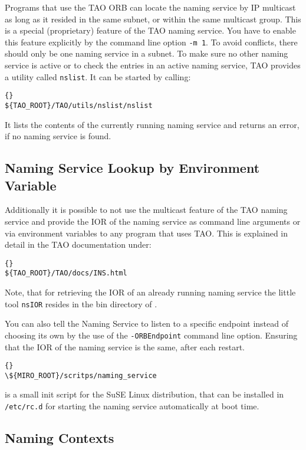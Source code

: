 Programs that use the TAO ORB can locate the naming service by IP
multicast as long as it resided in the same subnet, or within the same
multicast group. This is a special (proprietary) feature of the TAO
naming service. You have to enable this
feature explicitly by the command line option {\tt -m 1}. To avoid
conflicts, there should only be one naming service in a subnet. To
make sure no other naming service is active or to check the entries in
an active naming service, TAO provides a utility called {\tt nslist}.
It can be started by calling:

\begin{lstlisting}[frame=tb]{}
${TAO_ROOT}/TAO/utils/nslist/nslist 
\end{lstlisting}

It lists the contents of the currently running naming service and
returns an error, if no naming service is found.

\subsection{Naming Service Lookup by Environment Variable}

Additionally it is possible to not use the multicast feature of the
TAO naming service and provide the IOR of the naming service
as command line arguments or via environment variables to any program
that uses TAO. This is explained in detail in the TAO documentation
under:

\begin{lstlisting}[frame=tb]{}
${TAO_ROOT}/TAO/docs/INS.html
\end{lstlisting}

Note, that for retrieving the IOR of an already running naming service the
little tool {\tt nsIOR} resides in the bin directory of \miro.

You can also tell the Naming Service to listen to a specific endpoint
instead of choosing its own by the use of the {\tt -ORBEndpoint}
command line option. Ensuring that the IOR of the naming service is
the same, after each restart. 

\begin{lstlisting}[frame=tb]{}
\${MIRO_ROOT}/scritps/naming_service
\end{lstlisting}

is a small init script for the SuSE Linux distribution, that can be
installed in {\tt /etc/rc.d} for starting the naming service
automatically at boot time.


\subsection{Naming Contexts}

